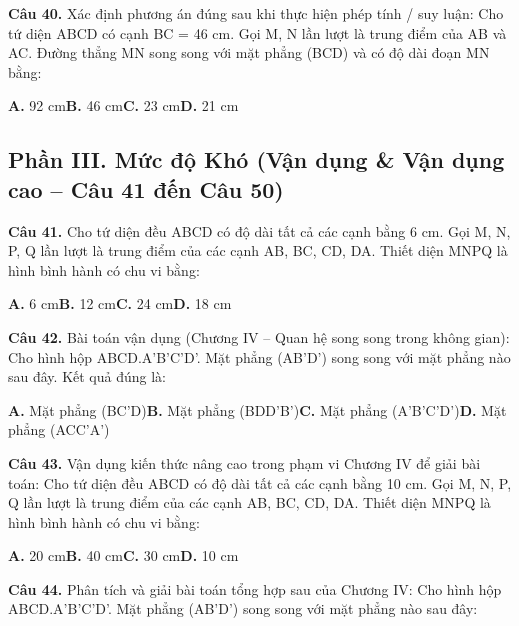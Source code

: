 \documentclass[11pt,a4paper]{article}
\begin{document}
\textbf{\color{primary} Câu 40.} Xác định phương án đúng sau khi thực hiện phép tính / suy luận: Cho tứ diện ABCD có cạnh BC = 46 cm. Gọi M, N lần lượt là trung điểm của AB và AC. Đường thẳng MN song song với mặt phẳng (BCD) và có độ dài đoạn MN bằng:\par
\hspace*{1.5em}\textbf{A.} 92 cm\quad\quad \textbf{B.} 46 cm\quad\quad \textbf{C.} 23 cm\quad\quad \textbf{D.} 21 cm\par\vspace{2pt}
\subsection*{\color{accent} Phần III. Mức độ Khó (Vận dụng \& Vận dụng cao -- Câu 41 đến Câu 50)}
\textbf{\color{primary} Câu 41.} Cho tứ diện đều ABCD có độ dài tất cả các cạnh bằng 6 cm. Gọi M, N, P, Q lần lượt là trung điểm của các cạnh AB, BC, CD, DA. Thiết diện MNPQ là hình bình hành có chu vi bằng:\par
\hspace*{1.5em}\textbf{A.} 6 cm\quad\quad \textbf{B.} 12 cm\quad\quad \textbf{C.} 24 cm\quad\quad \textbf{D.} 18 cm\par\vspace{2pt}
\textbf{\color{primary} Câu 42.} Bài toán vận dụng (Chương IV – Quan hệ song song trong không gian): Cho hình hộp ABCD.A'B'C'D'. Mặt phẳng (AB'D') song song với mặt phẳng nào sau đây. Kết quả đúng là:\par
\hspace*{1.5em}\textbf{A.} Mặt phẳng (BC'D)\quad\quad \textbf{B.} Mặt phẳng (BDD'B')\quad\quad \textbf{C.} Mặt phẳng (A'B'C'D')\quad\quad \textbf{D.} Mặt phẳng (ACC'A')\par\vspace{2pt}
\textbf{\color{primary} Câu 43.} Vận dụng kiến thức nâng cao trong phạm vi Chương IV để giải bài toán: Cho tứ diện đều ABCD có độ dài tất cả các cạnh bằng 10 cm. Gọi M, N, P, Q lần lượt là trung điểm của các cạnh AB, BC, CD, DA. Thiết diện MNPQ là hình bình hành có chu vi bằng:\par
\hspace*{1.5em}\textbf{A.} 20 cm\quad\quad \textbf{B.} 40 cm\quad\quad \textbf{C.} 30 cm\quad\quad \textbf{D.} 10 cm\par\vspace{2pt}
\textbf{\color{primary} Câu 44.} Phân tích và giải bài toán tổng hợp sau của Chương IV: Cho hình hộp ABCD.A'B'C'D'. Mặt phẳng (AB'D') song song với mặt phẳng nào sau đây:\par
\end{document}
